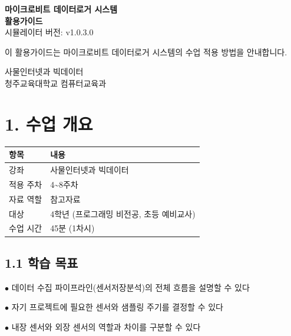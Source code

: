 \documentclass[11pt,a4paper]{article}
\begin{document}
\begin{titlepage}
\centering
\vspace*{3cm}
{\Huge\bfseries\color{primary} 마이크로비트 데이터로거 시스템}\\[0.5cm]
{\Huge\bfseries\color{primary} 활용가이드}
\\[1.5cm]
{\Large 시뮬레이터 버전: v1.0.3.0}
\\[2cm]
\begin{tcolorbox}[summarybox]
\centering
{\large 이 활용가이드는 마이크로비트 데이터로거 시스템의 수업 적용 방법을 안내합니다.}
\end{tcolorbox}
\vfill
{\large 사물인터넷과 빅데이터}\\[0.3cm]
{\large 청주교육대학교 컴퓨터교육과}
\vspace{1cm}
\end{titlepage}

\section*{1. 수업 개요}

\begin{center}
\renewcommand{\arraystretch}{1.4}
\begin{tabular}{|p{2.8cm}|p{12.2cm}|}
\hline
\rowcolor{tableheader}
\textbf{항목} & \textbf{내용} \\
\hline
강좌 & 사물인터넷과 빅데이터 \\
\hline
적용 주차 & 4\textasciitilde{}8주차 \\
\hline
자료 역할 & 참고자료 \\
\hline
대상 & 4학년 (프로그래밍 비전공, 초등 예비교사) \\
\hline
수업 시간 & 45분 (1차시) \\
\hline
\end{tabular}
\end{center}

\subsection*{1.1 학습 목표}

$\bullet$ 데이터 수집 파이프라인(센서\textrightarrow{}저장\textrightarrow{}분석)의 전체 흐름을 설명할 수 있다

$\bullet$ 자기 프로젝트에 필요한 센서와 샘플링 주기를 결정할 수 있다

$\bullet$ 내장 센서와 외장 센서의 역할과 차이를 구분할 수 있다
\end{document}
